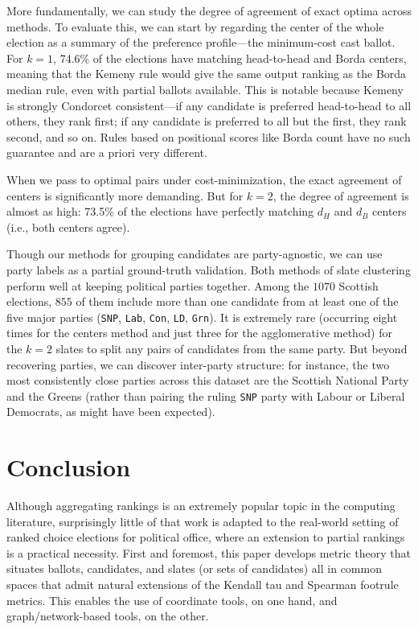 \documentclass{amsart}
\newcommand{\Con}{{\tt Con}\xspace}
\newcommand{\LD}{{\tt LD}\xspace}
\newcommand{\SNP}{{\tt SNP}\xspace}
\newcommand{\Lab}{{\tt Lab}\xspace}
\newcommand{\Grn}{{\tt Grn}\xspace}
\theoremstyle{plain}
\theoremstyle{definition}
\theoremstyle{remark}
\begin{document}
More fundamentally, we can study the degree of agreement of exact optima across methods.  To evaluate this, we can start by regarding the center of the whole election as a summary of the preference profile---the minimum-cost cast ballot.
For $k=1$, 74.6\% of the elections have matching head-to-head and Borda centers, meaning that the Kemeny rule would give the same output ranking as the Borda median rule, even with partial ballots available.  This is notable because Kemeny is strongly Condorcet consistent---if any candidate is preferred head-to-head to all others, they rank first; if any candidate is preferred to all but the first, they rank second, and so on.  Rules based on positional scores like Borda count have no such guarantee and are a priori very different. 

When we pass to optimal pairs under cost-minimization, the exact agreement of centers is significantly more demanding.  But for $k=2$, the degree of agreement is almost as high:  73.5\% of the elections have perfectly matching $d_H$ and $d_B$ centers (i.e., both centers agree).

Though our methods for grouping candidates are party-agnostic, we can use party labels as a partial ground-truth validation.  
Both methods of slate clustering perform well at keeping political parties together.  Among the $1070$ Scottish elections, $855$ of them include more than one candidate from at least one of the five major parties (\SNP, \Lab, \Con, \LD, \Grn).  It is extremely rare (occurring eight times for the centers method and just three for the agglomerative method) for the $k=2$ slates to split any pairs of candidates from the same party.  But beyond recovering parties, we can discover inter-party structure: for instance, the two most consistently close parties across this dataset are the Scottish National Party and the Greens (rather than pairing the ruling \SNP party with Labour or Liberal Democrats, as might have been expected).  

\section{Conclusion}

Although aggregating rankings is an extremely popular topic in the computing literature, surprisingly little of that work is adapted to the real-world setting of ranked choice elections for political office, where an extension to partial rankings is a practical necessity.  First and foremost, this paper develops metric theory that situates ballots, candidates, and slates (or sets of candidates) all in common spaces that admit natural extensions of the Kendall tau and Spearman footrule metrics.  This enables the use of coordinate tools, on one hand, and graph/network-based tools, on the other.
\end{document}
